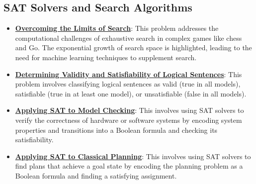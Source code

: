 \documentclass{article}%
\begin{document}
\subsection{SAT Solvers and Search Algorithms}%
\label{subsec:SATSolversandSearchAlgorithms}%
\begin{itemize}[leftmargin=*]%
\item \href{https://purdue.brightspace.com/d2l/common/assets/pdfjs-d2l-dist/1.0.14-legacy/web/viewer.html?file=%2Fcontent%2Fenforced%2F1095467-wl.202510.CS.24300.001%2F02L2-Intro.pdf%3Fou%3D1095467&lang=en-us&container=d2l-fileviewer-rendered-pdf&fullscreen=d2l-fileviewer-rendered-pdf-dialog&height=667#page=11}{\textbf{Overcoming the Limits of Search}}: This problem addresses the computational challenges of exhaustive search in complex games like chess and Go. The exponential growth of search space is highlighted, leading to the need for machine learning techniques to supplement search.%
\item \href{https://purdue.brightspace.com/d2l/common/assets/pdfjs-d2l-dist/1.0.14-legacy/web/viewer.html?file=%2Fcontent%2Fenforced%2F1095467-wl.202510.CS.24300.001%2F13L1-Logic.pdf%3Fou%3D1095467&lang=en-us&container=d2l-fileviewer-rendered-pdf&fullscreen=d2l-fileviewer-rendered-pdf-dialog&height=667#page=13}{\textbf{Determining Validity and Satisfiability of Logical Sentences}}: This problem involves classifying logical sentences as valid (true in all models), satisfiable (true in at least one model), or unsatisfiable (false in all models).%
\item \href{https://purdue.brightspace.com/d2l/common/assets/pdfjs-d2l-dist/1.0.14-legacy/web/viewer.html?file=%2Fcontent%2Fenforced%2F1095467-wl.202510.CS.24300.001%2F13L1-Logic.pdf%3Fou%3D1095467&lang=en-us&container=d2l-fileviewer-rendered-pdf&fullscreen=d2l-fileviewer-rendered-pdf-dialog&height=667#page=20}{\textbf{Applying SAT to Model Checking}}: This involves using SAT solvers to verify the correctness of hardware or software systems by encoding system properties and transitions into a Boolean formula and checking its satisfiability.%
\item \href{https://purdue.brightspace.com/d2l/common/assets/pdfjs-d2l-dist/1.0.14-legacy/web/viewer.html?file=%2Fcontent%2Fenforced%2F1095467-wl.202510.CS.24300.001%2F13L1-Logic.pdf%3Fou%3D1095467&lang=en-us&container=d2l-fileviewer-rendered-pdf&fullscreen=d2l-fileviewer-rendered-pdf-dialog&height=667#page=21}{\textbf{Applying SAT to Classical Planning}}: This involves using SAT solvers to find plans that achieve a goal state by encoding the planning problem as a Boolean formula and finding a satisfying assignment.%

\end{itemize}
\end{document}
